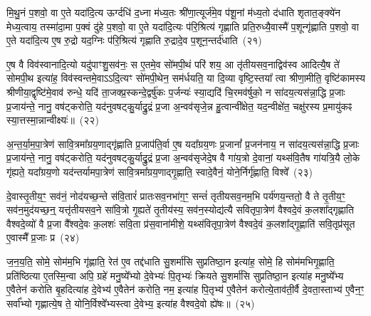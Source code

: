 मि॒थु॒नं प॒शवो॒ वा ए॒ते यदा॑दि॒त्य ऊर्ग्दधि॑ द॒ध्ना म॑ध्य॒तः श्री॑णा॒त्यूर्ज॑मे॒व प॑शू॒नां म॑ध्य॒तो द॑धाति शृतात॒ङ्क्ये॑न मेध्य॒त्वाय॒ तस्मा॑दा॒मा प॒क्वं दु॑हे प॒शवो॒ वा ए॒ते यदा॑दि॒त्यः प॑रि॒श्रित्य॑ गृह्णाति प्रति॒रुध्यै॒वास्मै॑ प॒शून्गृ॑ह्णाति प॒शवो॒ वा ए॒ते यदा॑दि॒त्य ए॒ष रु॒द्रो यद॒ग्निः प॑रि॒श्रित्य॑ गृह्णाति रु॒द्रादे॒व प॒शून॒न्तर्द॑धाति~(२१)\ip

ए॒ष वै विव॑स्वानादि॒त्यो यदु॑पाꣳशु॒सव॑नः॒ स ए॒तमे॒व सो॑मपी॒थं परि॑ शय॒ आ तृ॑तीय\-सव॒नाद्विव॑स्व आदित्यै॒ष ते॑ सोमपी॒थ इत्या॑ह॒ विव॑स्वन्तमे॒वा\-ऽऽ\-दि॒त्यꣳ सो॑मपी॒थेन॒ सम॑र्धयति॒ या दि॒व्या वृष्टि॒स्तया᳚ त्वा श्रीणा॒मीति॒ वृष्टि॑कामस्य श्रीणीया॒द्वृष्टि॑मे॒वाव॑ रुन्धे॒ यदि॑ ता॒जक्प्र॒स्कन्दे॒द्वर्\mbox{}षु॑कः प॒र्जन्यः॑ स्या॒द्यदि॑ चि॒रमव॑र्\mbox{}षुको॒ न सा॑दय॒त्यस॑न्ना॒द्धि प्र॒जाः प्र॒जाय॑न्ते॒ नानु॒ वष॑ट्करोति॒ यद॑नुवषट्कु॒र्याद्रु॒द्रं प्र॒जा अ॒न्वव॑सृजे॒न्न हु॒त्वान्वी᳚क्षेत॒ यद॒न्वीक्षे॑त॒ चक्षु॑रस्य प्र॒मायु॑कꣴ स्या॒त्तस्मा॒न्नान्वीक्ष्यः॑॥~(२२)\ip

{\anuvakamend[{ए॒व य॒ज्ञाज्ज॒रायु॒ तदे॒व तद॒न्तर्द॑धाति॒ न स॒प्तविꣳ॑शतिश्च}]}

अ॒न्त॒र्या॒म॒पा॒त्रेण॑ सावि॒त्रमा᳚ग्रय॒णाद्गृ॑ह्णाति प्र॒जा\-प॑ति॒र्वा ए॒ष यदा᳚ग्रय॒णः प्र॒जानां᳚ प्र॒जन॑नाय॒ न सा॑दय॒त्यस॑न्ना॒द्धि प्र॒जाः प्र॒जाय॑न्ते॒ नानु॒ वष॑ट्करोति॒ यद॑नुवषट्कु॒र्याद्रु॒द्रं प्र॒जा अ॒न्वव॑सृजेदे॒ष वै गा॑य॒त्रो दे॒वानां॒ यथ्स॑वि॒तैष गा॑यत्रि॒यै लो॒के गृ॑ह्यते॒ यदा᳚ग्रय॒णो यद॑न्तर्यामपा॒त्रेण॑ सावि॒त्रमा᳚ग्रय॒णाद्गृ॒ह्णाति॒ स्वादे॒वैनं॒ योने॒र्निर्गृ॑ह्णाति॒ विश्वे᳚~(२३)\ip

दे॒वास्तृ॒तीय॒ꣳ॒ सव॑नं॒ नोद॑यच्छ॒न्ते स॑वि॒तारं॑ प्रातःसव॒नभा॑ग॒ꣳ॒ सन्तं॑ तृतीय\-सव॒नम॒भि पर्य॑णय॒न्ततो॒ वै ते तृ॒तीय॒ꣳ॒ सव॑न॒मुद॑यच्छ॒न्॒ यत्तृ॑तीय\-सव॒ने सा॑वि॒त्रो गृ॒ह्यते॑ तृ॒तीय॑स्य॒ सव॑न॒स्योद्य॑त्यै सवितृपा॒त्रेण॑ वैश्वदे॒वं क॒लशा᳚द्गृह्णाति वैश्वदे॒व्यो॑ वै प्र॒जा वै᳚श्वदे॒वः क॒लशः॑ सवि॒ता प्र॑स॒वाना॑मीशे॒ यथ्स॑वितृपा॒त्रेण॑ वैश्वदे॒वं क॒लशा᳚द्गृ॒ह्णाति॑ सवि॒तृप्र॑सूत ए॒वास्मै᳚ प्र॒जाः प्र~(२४)\ip

ज॒न॒य॒ति॒ सोमे॒ सोम॑म॒भि गृ॑ह्णाति॒ रेत॑ ए॒व तद्द॑धाति सु॒शर्मा॑सि सुप्रतिष्ठा॒न इत्या॑ह॒ सोमे॒ हि सोम॑मभिगृ॒ह्णाति॒ प्रति॑ष्ठित्या ए॒तस्मि॒न्वा अपि॒ ग्रहे॑ मनु॒ष्ये᳚भ्यो दे॒वेभ्यः॑ पि॒तृभ्यः॑ क्रियते सु॒शर्मा॑सि सुप्रतिष्ठा॒न इत्या॑ह मनु॒ष्ये᳚भ्य ए॒वैतेन॑ करोति बृ॒हदित्या॑ह दे॒वेभ्य॑ ए॒वैतेन॑ करोति॒ नम॒ इत्या॑ह पि॒तृभ्य॑ ए॒वैतेन॑ करोत्ये॒ताव॑ती॒र्वै दे॒वता॒स्ताभ्य॑ ए॒वैन॒ꣳ॒ सर्वा᳚भ्यो गृह्णात्ये॒ष ते॒ योनि॒र्विश्वे᳚भ्यस्त्वा दे॒वेभ्य॒ इत्या॑ह वैश्वदे॒वो ह्ये॑षः॥~(२५)\ip

{\anuvakamend[{विश्वे॒ प्र पि॒तृभ्य॑ ए॒वैतेन॑ करो॒त्येका॒न्नविꣳ॑श॒तिश्च॑}]}

